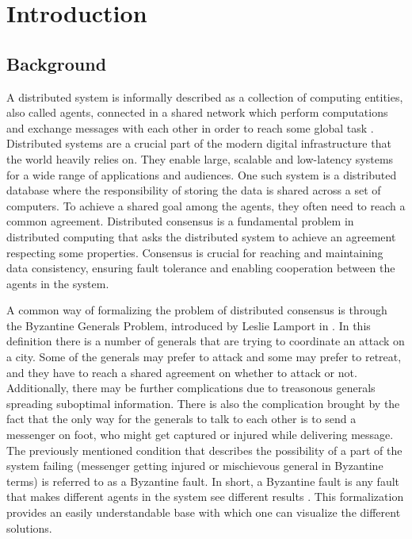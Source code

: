 \section{Introduction}
\thispagestyle{empty}

\subsection{Background}

A distributed system is informally described as a collection of computing entities, also called agents, connected in a shared network which perform computations and exchange messages with each other in order to reach some global task \cite{Coulouris_systems_2005}. Distributed systems are a crucial part of the modern digital infrastructure that the world heavily relies on. They enable large, scalable and low-latency systems for a wide range of applications and audiences. One such system is a distributed database where the responsibility of storing the data is shared across a set of computers. To achieve a shared goal among the agents, they often need to reach a common agreement.  Distributed consensus is a fundamental problem in distributed computing that asks the distributed system to achieve an agreement respecting some properties. Consensus is crucial for reaching and maintaining data consistency, ensuring fault tolerance and enabling cooperation between the agents in the system. 

A common way of formalizing the problem of distributed consensus is through the Byzantine Generals Problem, introduced by Leslie Lamport in \cite{lamportByzantineGeneralsProblem}. In this definition there is a number of generals that are trying to coordinate an attack on a city. Some of the generals may prefer to attack and some may prefer to retreat, and they have to reach a shared agreement on whether to attack or not. Additionally, there may be further complications due to treasonous generals spreading suboptimal information. There is also the complication brought by the fact that the only way for the generals to talk to each other is to send a messenger on foot, who might get captured or injured while delivering message. 
The previously mentioned condition that describes the possibility of a part of the system failing (messenger getting injured or mischievous general in Byzantine terms) is referred to as a Byzantine fault. In short, a Byzantine fault is any fault that makes different agents in the system see different results \cite{driscollRealByzantineGenerals2004}. 
This formalization provides an easily understandable base with which one can visualize the different solutions.

